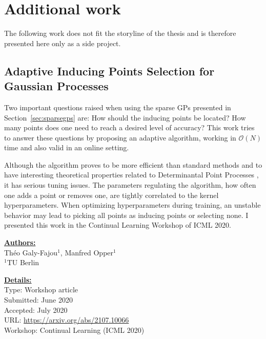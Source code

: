 \chapter{Additional work} 
\label{appendix:worshoppapers}
The following work does not fit the storyline of the thesis and is therefore presented here only as a side project.

\section{Adaptive Inducing Points Selection for Gaussian Processes}

Two important questions raised when using the sparse \acp{GP} presented in Section~\ref{sec:sparsegps} are:
How should the inducing points be located?
How many points does one need to reach a desired level of accuracy?
This work tries to answer these questions by proposing an adaptive algorithm, working in $\mathcal{O}(N)$ time and also valid in an online setting.

Although the algorithm proves to be more efficient than standard methods and to have interesting theoretical properties related to Determinantal Point Processes \cite{Kulesza2012}, it has serious tuning issues.
The parameters regulating the algorithm, how often one adds a point or removes one, are tightly correlated to the kernel hyperparameters.
When optimizing hyperparameters during training, an unstable behavior may lead to picking all points as inducing points or selecting none.
I presented this work in the Continual Learning Workshop of ICML 2020.

\textbf{\underline{Authors:}}\\
Th\'eo Galy-Fajou$^1$, Manfred Opper$^1$\\
\small{$^1$TU Berlin}

\textbf{\underline{Details:}}\\
Type: Workshop article\\
Submitted: June 2020\\
Accepted: July 2020\\
URL: \url{https://arxiv.org/abs/2107.10066}\\
Workshop: Continual Learning (ICML 2020)\\




